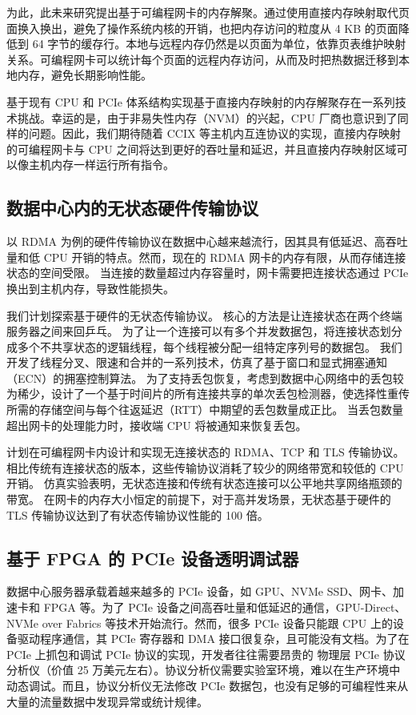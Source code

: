 为此，此未来研究提出基于可编程网卡的内存解聚。通过使用直接内存映射取代页面换入换出，避免了操作系统内核的开销，也把内存访问的粒度从 4 KB 的页面降低到 64 字节的缓存行。本地与远程内存仍然是以页面为单位，依靠页表维护映射关系。可编程网卡可以统计每个页面的远程内存访问，从而及时把热数据迁移到本地内存，避免长期影响性能。

基于现有 CPU 和 PCIe 体系结构实现基于直接内存映射的内存解聚存在一系列技术挑战。幸运的是，由于非易失性内存（NVM）的兴起，CPU 厂商也意识到了同样的问题。因此，我们期待随着 CCIX 等主机内互连协议的实现，直接内存映射的可编程网卡与 CPU 之间将达到更好的吞吐量和延迟，并且直接内存映射区域可以像主机内存一样运行所有指令。


\subsection{数据中心内的无状态硬件传输协议}

以 RDMA 为例的硬件传输协议在数据中心越来越流行，因其具有低延迟、高吞吐量和低 CPU 开销的特点。然而，现在的 RDMA 网卡的内存有限，从而存储连接状态的空间受限。
当连接的数量超过内存容量时，网卡需要把连接状态通过 PCIe 换出到主机内存，导致性能损失。

我们计划探索基于硬件的无状态传输协议。
核心的方法是让连接状态在两个终端服务器之间来回乒乓。
为了让一个连接可以有多个并发数据包，将连接状态划分成多个不共享状态的逻辑线程，每个线程被分配一组特定序列号的数据包。
我们开发了线程分叉、限速和合并的一系列技术，仿真了基于窗口和显式拥塞通知（ECN）的拥塞控制算法。
为了支持丢包恢复，考虑到数据中心网络中的丢包较为稀少，设计了一个基于时间片的所有连接共享的单次丢包检测器，使选择性重传所需的存储空间与每个往返延迟（RTT）中期望的丢包数量成正比。
当丢包数量超出网卡的处理能力时，接收端 CPU 将被通知来恢复丢包。

计划在可编程网卡内设计和实现无连接状态的 RDMA、TCP 和 TLS 传输协议。
相比传统有连接状态的版本，这些传输协议消耗了较少的网络带宽和较低的 CPU 开销。
仿真实验表明，无状态连接和传统有状态连接可以公平地共享网络瓶颈的带宽。
在网卡的内存大小恒定的前提下，对于高并发场景，无状态基于硬件的 TLS 传输协议达到了有状态传输协议性能的 100 倍。



\subsection{基于 FPGA 的 PCIe 设备透明调试器}

数据中心服务器承载着越来越多的 PCIe 设备，如 GPU、NVMe SSD、网卡、加速卡和 FPGA 等。为了 PCIe 设备之间高吞吐量和低延迟的通信，GPU-Direct、NVMe over Fabrics 等技术开始流行。然而，很多 PCIe 设备只能跟 CPU 上的设备驱动程序通信，其 PCIe 寄存器和 DMA 接口很复杂，且可能没有文档。为了在 PCIe 上抓包和调试 PCIe 协议的实现，开发者往往需要昂贵的 物理层 PCIe 协议分析仪（价值 25 万美元左右）。协议分析仪需要实验室环境，难以在生产环境中动态调试。而且，协议分析仪无法修改 PCIe 数据包，也没有足够的可编程性来从大量的流量数据中发现异常或统计规律。

